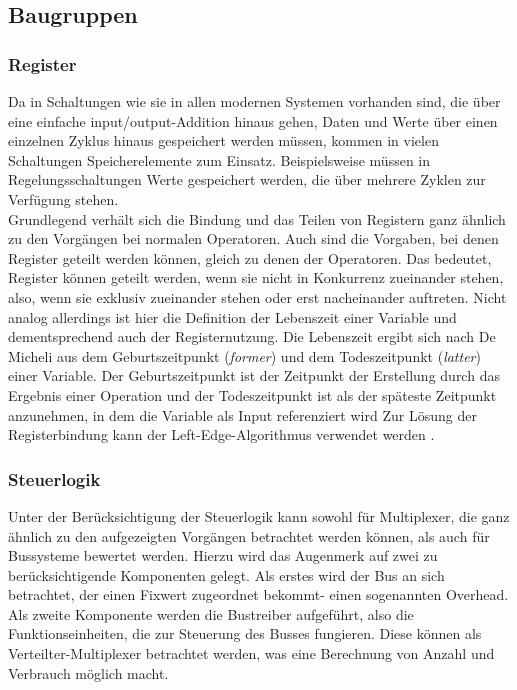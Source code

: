 \documentclass[conference]{IEEEtran}
\begin{document}
\subsection{Baugruppen}
 \subsubsection{Register}
 Da in Schaltungen wie sie in allen modernen Systemen vorhanden sind, die über eine einfache input/output-Addition hinaus gehen, Daten und Werte über einen einzelnen Zyklus hinaus gespeichert werden müssen, kommen in vielen Schaltungen Speicherelemente zum Einsatz. Beispielsweise müssen in Regelungsschaltungen Werte gespeichert werden, die über mehrere Zyklen zur Verfügung stehen. \\
 Grundlegend verhält sich die Bindung und das Teilen von Registern ganz ähnlich zu den Vorgängen bei normalen Operatoren. Auch sind die Vorgaben, bei denen Register geteilt werden können, gleich zu denen der Operatoren. Das bedeutet, Register können geteilt werden, wenn sie nicht in Konkurrenz zueinander stehen, also, wenn sie exklusiv zueinander stehen oder erst nacheinander auftreten. Nicht analog allerdings ist hier die Definition der Lebenszeit einer Variable und dementsprechend auch der Registernutzung. Die Lebenszeit ergibt sich nach De Micheli aus dem Geburtszeitpunkt (\textit{former})  und dem Todeszeitpunkt (\textit{latter}) einer Variable. Der Geburtszeitpunkt ist der Zeitpunkt der Erstellung durch das Ergebnis einer Operation und der Todeszeitpunkt ist als der späteste Zeitpunkt anzunehmen, in dem die Variable als Input referenziert wird\cite[S. 240]{3}
Zur Lösung der Registerbindung kann der Left-Edge-Algorithmus verwendet werden \cite[S. 359]{2}.\\
 \subsubsection{Steuerlogik}
 Unter der Berücksichtigung der Steuerlogik kann sowohl für Multiplexer, die ganz ähnlich zu den aufgezeigten Vorgängen betrachtet werden können, als auch für Bussysteme bewertet werden. Hierzu wird das Augenmerk auf zwei zu berücksichtigende Komponenten gelegt. Als erstes wird der Bus an sich betrachtet, der einen Fixwert zugeordnet bekommt- einen sogenannten Overhead.
Als zweite Komponente werden die Bustreiber aufgeführt, also die Funktionseinheiten, die zur Steuerung des Busses fungieren. Diese können als Verteilter-Multiplexer betrachtet werden, was eine Berechnung von Anzahl und Verbrauch möglich macht.\cite[S. 157]{3}\\
\end{document}
